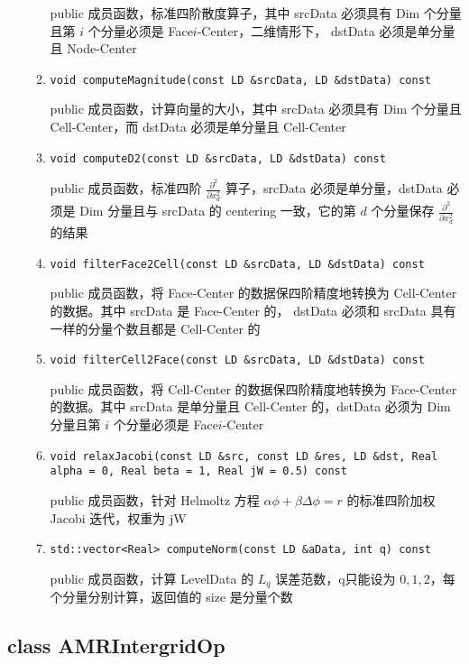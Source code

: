 \documentclass[cn, bibend=bibtex]{elegantpaper}
\theoremstyle{plain}
\begin{document}
\begin{itemize}
\begin{enumerate}
    public 成员函数，标准四阶散度算子，其中 srcData 必须具有 Dim 个分量且第 $i$ 个分量必须是 Face$i$-Center，二维情形下， dstData 必须是单分量且 Node-Center
    \item \lstinline|void computeMagnitude(const LD &srcData, LD &dstData) const|

    public 成员函数，计算向量的大小，其中 srcData 必须具有 Dim 个分量且 Cell-Center，而 dstData 必须是单分量且 Cell-Center
    \item \lstinline|void computeD2(const LD &srcData, LD &dstData) const|

    public 成员函数，标准四阶 $\frac{\partial^2}{\partial x_d^2}$ 算子，srcData 必须是单分量，dstData 必须是 Dim 分量且与 srcData 的 centering 一致，它的第 $d$ 个分量保存 $\frac{\partial^2}{\partial x_d^2}$ 的结果
    \item \lstinline|void filterFace2Cell(const LD &srcData, LD &dstData) const|

    public 成员函数，将 Face-Center 的数据保四阶精度地转换为 Cell-Center 的数据。其中 srcData 是 Face-Center 的，
    dstData 必须和 srcData 具有一样的分量个数且都是 Cell-Center 的
    \item \lstinline|void filterCell2Face(const LD &srcData, LD &dstData) const|

    public 成员函数，将 Cell-Center 的数据保四阶精度地转换为 Face-Center 的数据。其中 srcData 是单分量且 Cell-Center 的，dstData 必须为 Dim 分量且第 $i$ 个分量必须是 Face$i$-Center
    \item \lstinline|void relaxJacobi(const LD &src, const LD &res, LD &dst, Real alpha = 0, Real beta = 1, Real jW = 0.5) const|

    public 成员函数，针对 Helmoltz 方程 $\alpha \phi + \beta \Delta \phi = r$ 的标准四阶加权 Jacobi 迭代，权重为 jW
    \item \lstinline|std::vector<Real> computeNorm(const LD &aData, int q) const|

    public 成员函数，计算 LevelData 的 $L_q$ 误差范数，q只能设为 $0,1,2$，每个分量分别计算，返回值的 size 是分量个数
  \end{enumerate}
\end{itemize}

\subsection{class AMRIntergridOp}
\end{document}
